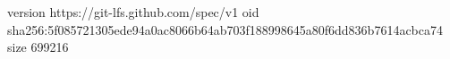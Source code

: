version https://git-lfs.github.com/spec/v1
oid sha256:5f085721305ede94a0ac8066b64ab703f188998645a80f6dd836b7614acbca74
size 699216
